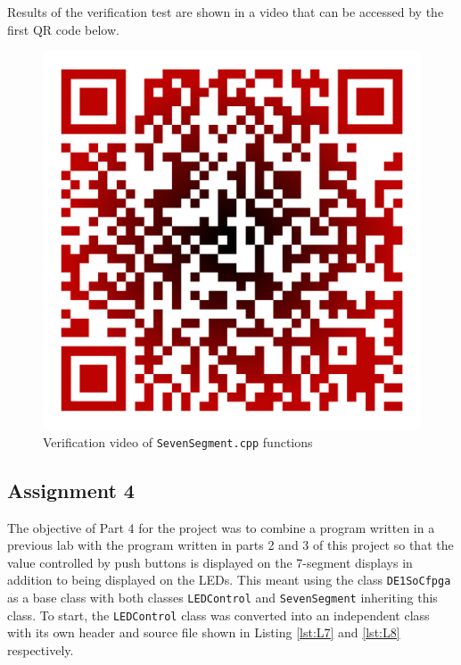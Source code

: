 \documentclass[
	letterpaper, %
	10pt, %
]{CSUniSchoolLabReport}
\begin{document}


Results of the verification test are shown in a video that can be accessed by the first QR code below.

\begin{figure}[h!]
  \centering
  \includegraphics[width=.55\textwidth]{Figures/Video1.png}
  \caption{Verification video of \texttt{SevenSegment.cpp} functions}
  \label{fig:1}
\end{figure}

\subsection{Assignment 4}

The objective of Part 4 for the project was to combine a program written in a previous lab with the program written in parts 2 and 3 of this project so that the value controlled by push buttons is displayed on the 7-segment displays in addition to being displayed on the LEDs. This meant using the class \texttt{DE1SoCfpga} as a base class with both classes \texttt{LEDControl} and \texttt{SevenSegment} inheriting this class. To start, the \texttt{LEDControl} class was converted into an independent class with its own header and source file shown in Listing \ref{lst:L7} and \ref{lst:L8} respectively.
\end{document}
